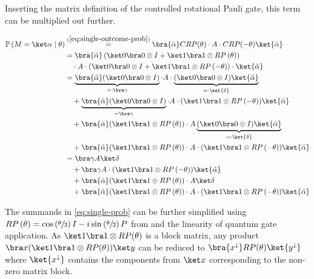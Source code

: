 Inserting the matrix definition of the controlled rotational Pauli gate, this
term can be multiplied out further.

\begin{equation}
    \label{eq:single-prob} 
    \begin{split}
        \mathbb P\left(M = \ket\alpha \mid \theta\right)
            &\stackrel{(\ref{eq:single-outcome-prob})}=\bra{\tilde\alpha} CRP(\theta) \cdot A \cdot CRP(-\theta) \ket{\tilde\alpha} \\
            &=\bra{\tilde\alpha}
                \left(\ket 0 \bra 0 \otimes I + \ket 1 \bra 1 \otimes RP\left(\theta\right)\right) \\
                &\quad \cdot A
                \cdot \left(\ket 0 \bra 0 \otimes I + \ket 1 \bra 1 \otimes RP\left(-\theta\right)\right)
                \cdot \ket{\tilde\alpha} \\
            &= \underbrace{\bra{\tilde\alpha} (\ket 0 \bra 0 \otimes I)}_{=: \bra\gamma} \cdot A \cdot \underbrace{(\ket 0 \bra 0 \otimes I) \ket{\tilde\alpha}}_{=: \ket{\delta}} \\
                &\quad + \underbrace{\bra{\tilde\alpha} (\ket 0 \bra 0 \otimes I)}_{= \bra\gamma} \cdot A \cdot (\ket 1 \bra 1 \otimes RP\left(-\theta\right)) \ket{\tilde\alpha} \\
                &\quad + \bra{\tilde\alpha} (\ket 1 \bra 1 \otimes RP\left(\theta\right)) \cdot A \underbrace{(\ket 0 \bra 0 \otimes I) \ket{\tilde\alpha}}_{=: \ket{\delta}} \\
                &\quad + \bra{\tilde\alpha} (\ket 1 \bra 1 \otimes RP\left(\theta\right)) \cdot A \cdot (\ket 1 \bra 1 \otimes RP\left(-\theta\right)) \ket{\tilde\alpha} \\
            &= \bra\gamma A \ket\delta \\
                &\quad + \bra\gamma A \cdot (\ket 1 \bra 1 \otimes RP\left(-\theta\right)) \ket{\tilde\alpha} \\
                &\quad + \bra{\tilde\alpha} (\ket 1 \bra 1 \otimes RP\left(\theta\right)) \cdot A \ket\delta \\
                &\quad + \bra{\tilde\alpha} (\ket 1 \bra 1 \otimes RP\left(\theta\right)) \cdot A \cdot (\ket 1 \bra 1 \otimes RP\left(-\theta\right)) \ket{\tilde\alpha} \\
    \end{split}
\end{equation}

The summands in \autoref{eq:single-prob} can be further simplified using
$RP\left(\theta\right) = \cos\left(\sfrac\theta2\right) I - i \sin\left(\sfrac\theta2\right) P$
from \cite{ostaszewski_structure_2021} and the linearity of quantum gate
application.
As $\ket1\bra1 \otimes RP(\theta)$ is a block matrix, any product
$\bra x (\ket1\bra1 \otimes RP(\theta)) \ket y$ can be reduced to
$\bra{x^\downarrow} RP(\theta) \ket{y^\downarrow}$ where $\ket{x^\downarrow}$
contains the components from $\ket x$ corresponding to the non-zero matrix block.

